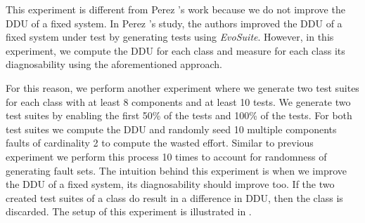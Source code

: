 \documentclass[twoside,a4paper,11pt]{memoir}
\begin{document}
This experiment is different from Perez \etal's work because we do not improve the DDU of a fixed system.
In Perez \etal's study, the authors improved the DDU of a fixed system under test by generating tests using \emph{EvoSuite}.
However, in this experiment, we compute the DDU for each class and measure for each class its diagnosability using the aforementioned approach.

For this reason, we perform another experiment where we generate two test suites for each class with at least 8 components and at least 10 tests.
We generate two test suites by enabling the first 50\% of the tests and 100\% of the tests.
For both test suites we compute the DDU and randomly seed 10 multiple components faults of cardinality 2 to compute the wasted effort.
Similar to previous experiment we perform this process 10 times to account for randomness of generating fault sets.
The intuition behind this experiment is when we improve the DDU of a fixed system, its diagnosability should improve too.
If the two created test suites of a class do result in a difference in DDU, then the class is discarded.
The setup of this experiment is illustrated in .
\end{document}
